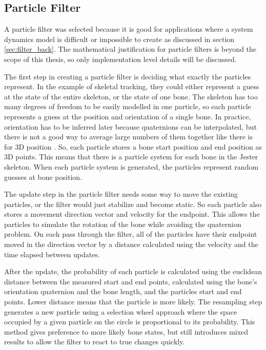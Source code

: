 \subsection{Particle Filter}\label{sec:filter_impl}

A particle filter was selected because it is good for applications where a system dynamics model is difficult or impossible to create as discussed in section \ref{sec:filter_back}. The mathematical justification for particle filters is beyond the scope of this thesis, so only implementation level details will be discussed.

The first step in creating a particle filter is deciding what exactly the particles represent. In the example of skeletal tracking, they could either represent a guess at the state of the entire skeleton, or the state of one bone. The skeleton has too many degrees of freedom to be easily modelled in one particle, so each particle represents a guess at the position and orientation of a single bone. In practice, orientation has to be inferred later because quaternions can be interpolated, but there is not a good way to average large numbers of them together like there is for 3D position \cite{markley2007averaging}. So, each particle stores a bone start position and end position as 3D points. This means that there is a particle system for each bone in the Jester skeleton. When each particle system is generated, the particles represent random guesses at bone position. 

The update step in the particle filter needs some way to move the existing particles, or the filter would just stabilize and become static. So each particle also stores a movement direction vector and velocity for the endpoint. This allows the particles to simulate the rotation of the bone while avoiding the quaternion problem. On each pass through the filter, all of the particles have their endpoint moved in the direction vector by a distance calculated using the velocity and the time elapsed between updates.

After the update, the probability of each particle is calculated using the euclidean distance between the measured start and end points, calculated using the bone's orientation quaternion and the bone length, and the particles start and end points. Lower distance means that the particle is more likely. The resampling step generates a new particle using a selection wheel approach where the space occupied by a given particle on the circle is proportional to its probability. This method gives preference to more likely bone states, but still introduces mixed results to allow the filter to react to true changes quickly.

